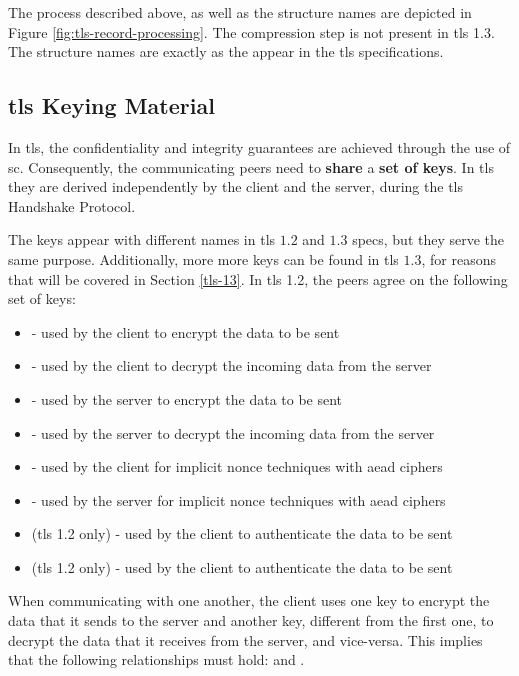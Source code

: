 \documentclass{llncs}
\begin{document}
The process described above, as well as the structure names are depicted in Figure \ref{fig:tls-record-processing}.
The compression step is not present in \gls{tls} 1.3. The structure names are exactly as the appear in the \gls{tls} specifications.

\subsection{\gls{tls} Keying Material} \label{keying}

In \gls{tls}, the confidentiality and integrity guarantees are achieved through the use
of \gls{sc}. Consequently, the communicating peers need to \textbf{share}
a \textbf{set of keys}. In \gls{tls} they are derived independently by the
client and the server, during the \gls{tls} Handshake Protocol.

The keys appear with different names in \gls{tls} $1.2$ and $1.3$ specs, but
they serve the same purpose. Additionally, more more keys can be found in
\gls{tls} $1.3$, for reasons that will be covered in Section \ref{tls-13}.
In \gls{tls} 1.2, the peers agree on the following set of keys:

\begin{itemize}
  \item {} - used by the client to encrypt the data to be sent
  \item {} - used by the client to decrypt the incoming data from the server
  \item {} - used by the server to encrypt the data to be sent
  \item {} - used by the server to decrypt the incoming data from the server
  \item {} - used by the client for implicit nonce techniques with \gls{aead} ciphers
  \item {} - used by the server for implicit nonce techniques with \gls{aead} ciphers
  \item {} (\gls{tls} 1.2 only) - used by the client to authenticate the data to be sent
  \item {} (\gls{tls} 1.2 only) - used by the client to authenticate the data to be sent
\end{itemize}

When communicating with one another, the client uses one key to
encrypt the data that it sends to the server and another key, different from the first one, to decrypt the data
that it receives from the server, and vice-versa. This implies that the  following relationships must hold:
 and .
\end{document}
